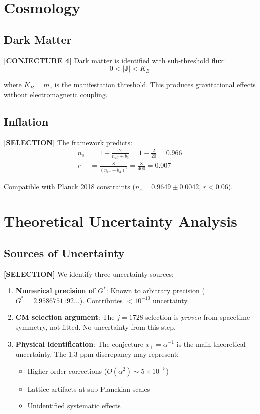 \documentclass[aps,prd,twocolumn,10pt,groupedaddress,superscriptaddress]{revtex4-2}
\begin{document}
\section{Cosmology}

\subsection{Dark Matter}

\textbf{[CONJECTURE 4]} Dark matter is identified with sub-threshold flux:
\begin{equation}
0 < |\mathbf{J}| < K_B
\end{equation}

where $K_B = m_e$ is the manifestation threshold. This produces gravitational effects without electromagnetic coupling.

\subsection{Inflation}

\textbf{[SELECTION]} The framework predicts:
\begin{align}
n_s &= 1 - \frac{2}{n_{\text{eff}} + b_3} = 1 - \frac{2}{20} = 0.966 \\
r &= \frac{8}{(n_{\text{eff}} + b_3)^2} = \frac{8}{400} = 0.007
\end{align}

Compatible with Planck 2018 constraints ($n_s = 0.9649 \pm 0.0042$, $r < 0.06$).

\section{Theoretical Uncertainty Analysis}

\subsection{Sources of Uncertainty}

\textbf{[SELECTION]} We identify three uncertainty sources:

\begin{enumerate}
\item \textbf{Numerical precision of $G^*$}: Known to arbitrary precision ($G^* = 2.9586751192...$). Contributes $<10^{-10}$ uncertainty.

\item \textbf{CM selection argument}: The $j = 1728$ selection is \textit{proven} from spacetime symmetry, not fitted. No uncertainty from this step.

\item \textbf{Physical identification}: The conjecture $x_+ = \alpha^{-1}$ is the main theoretical uncertainty. The 1.3 ppm discrepancy may represent:
\begin{itemize}
\item Higher-order corrections ($O(\alpha^2) \sim 5 \times 10^{-5}$)
\item Lattice artifacts at sub-Planckian scales
\item Unidentified systematic effects
\end{itemize}
\end{enumerate}
\end{document}
